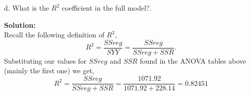 \documentclass[12pt]{article}
\makeatletter
\theoremstyle{homework}
\newenvironment{exercise}[1]
{\def\@currentlabel{#1}\exercisecore}
{\endexercisecore}
\newcommand{\localhead}[1]{\par\smallskip\noindent\textbf{#1}\nobreak\\}%
\newcommand\solution{\localhead{Solution:}}
\makeatother
\begin{document}
\begin{exercise}{3.}
  \item[d.] What is the $R^2$ coefficient in the full model?.\\
  \solution Recall the following definition of $R^2$,
  \begin{equation*}
    R^2 = \frac{SSreg}{SYY} = \frac{SSreg}{SSreg + SSR}.
  \end{equation*}
  Substituting our values for $SSreg$ and $SSR$ found in the ANOVA tables above (mainly the first one)
  we get,
  \begin{equation*}
    R^2 = \frac{SSreg}{SSreg + SSR} = \frac{1071.92}{1071.92 + 228.14} = 0.82451
  \end{equation*}
\end{exercise}
\end{document}
